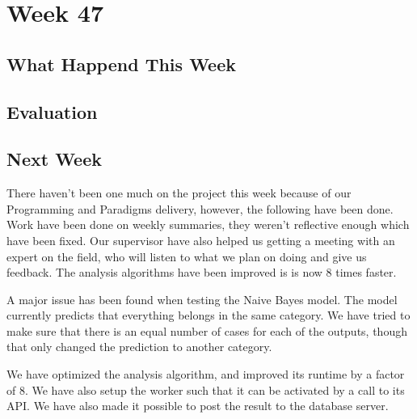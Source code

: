 \section*{Week 47}
\subsection*{What Happend This Week}


\subsection*{Evaluation}


\subsection*{Next Week}



There haven’t been one much on the project this week because of our Programming and Paradigms delivery, however, the following have been done.
Work have been done on weekly summaries, they weren’t reflective enough which have been fixed. 
Our supervisor have also helped us getting a meeting with an expert on the field, who will listen to what we plan on doing and give us feedback.
The analysis algorithms have been improved is is now 8 times faster.


A major issue has been found when testing the Naive Bayes model. The model currently predicts that everything belongs in the same category. We have tried to make sure that there is an equal number of cases for each of the outputs, though that only changed the prediction to another category. 

We have optimized the analysis algorithm, and improved its runtime by a factor of 8. We have also setup the worker such that it can be activated by a call to its API. We have also made it possible to post the result to the database server. 
